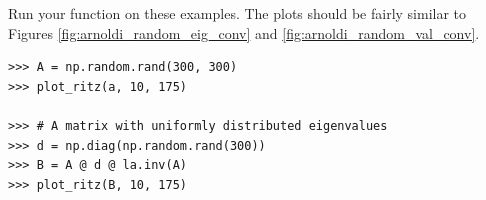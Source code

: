 \begin{problem}
Run your function on these examples.
The plots should be fairly similar to Figures \ref{fig:arnoldi_random_eig_conv} and \ref{fig:arnoldi_random_val_conv}.

\begin{lstlisting}
>>> A = np.random.rand(300, 300)
>>> plot_ritz(a, 10, 175)

>>> # A matrix with uniformly distributed eigenvalues
>>> d = np.diag(np.random.rand(300))
>>> B = A @ d @ la.inv(A)
>>> plot_ritz(B, 10, 175)
\end{lstlisting}
\end{problem}


